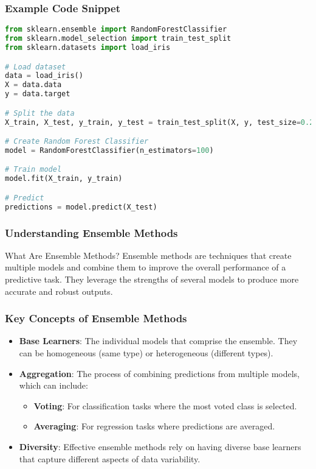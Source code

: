 \documentclass[aspectratio=169]{beamer}
\begin{document}
\begin{frame}[fragile]
    \frametitle{Example Code Snippet}
    \begin{lstlisting}[language=Python]
from sklearn.ensemble import RandomForestClassifier
from sklearn.model_selection import train_test_split
from sklearn.datasets import load_iris

# Load dataset
data = load_iris()
X = data.data
y = data.target

# Split the data
X_train, X_test, y_train, y_test = train_test_split(X, y, test_size=0.2, random_state=42)

# Create Random Forest Classifier
model = RandomForestClassifier(n_estimators=100)

# Train model
model.fit(X_train, y_train)

# Predict
predictions = model.predict(X_test)
    \end{lstlisting}
\end{frame}

\begin{frame}[fragile]
    \frametitle{Understanding Ensemble Methods}
    \begin{block}{What Are Ensemble Methods?}
        Ensemble methods are techniques that create multiple models and combine them to improve the overall performance of a predictive task. They leverage the strengths of several models to produce more accurate and robust outputs.
    \end{block}
\end{frame}

\begin{frame}[fragile]
    \frametitle{Key Concepts of Ensemble Methods}
    \begin{itemize}
        \item \textbf{Base Learners}: The individual models that comprise the ensemble. They can be homogeneous (same type) or heterogeneous (different types).
        
        \item \textbf{Aggregation}: The process of combining predictions from multiple models, which can include:
        \begin{itemize}
            \item \textbf{Voting}: For classification tasks where the most voted class is selected.
            \item \textbf{Averaging}: For regression tasks where predictions are averaged.
        \end{itemize}
        
        \item \textbf{Diversity}: Effective ensemble methods rely on having diverse base learners that capture different aspects of data variability.
    \end{itemize}
\end{frame}
\end{document}
